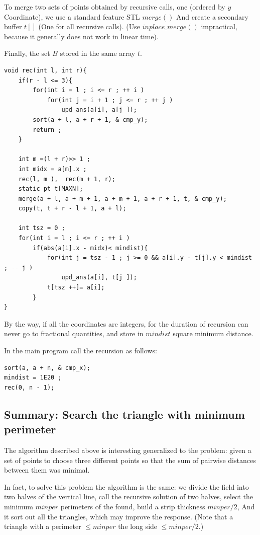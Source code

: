 To merge two sets of points obtained by recursive calls, one (ordered by $y$ Coordinate), we use a standard feature STL $merge()$ And create a secondary buffer $t []$ (One for all recursive calls). (Use $inplace \_merge()$ impractical, because it generally does not work in linear time).

Finally, the set $B$ stored in the same array $t$.

\begin{verbatim}
void rec(int l, int r){
    if(r - l <= 3){
        for(int i = l ; i <= r ; ++ i )
            for(int j = i + 1 ; j <= r ; ++ j )
                upd_ans(a[i], a[j ]);
        sort(a + l, a + r + 1, & cmp_y);
        return ;
    }
 
    int m =(l + r)>> 1 ;
    int midx = a[m].x ;
    rec(l, m ),  rec(m + 1, r);
    static pt t[MAXN];
    merge(a + l, a + m + 1, a + m + 1, a + r + 1, t, & cmp_y);
    copy(t, t + r - l + 1, a + l);
 
    int tsz = 0 ;
    for(int i = l ; i <= r ; ++ i )
        if(abs(a[i].x - midx)< mindist){
            for(int j = tsz - 1 ; j >= 0 && a[i].y - t[j].y < mindist ; -- j )
                upd_ans(a[i], t[j ]);
            t[tsz ++]= a[i];
        }
} 
\end{verbatim}
By the way, if all the coordinates are integers, for the duration of recursion can never go to fractional quantities, and store in $mindist$ square minimum distance.

In the main program call the recursion as follows:

\begin{verbatim}
sort(a, a + n, & cmp_x);
mindist = 1E20 ;
rec(0, n - 1); 
\end{verbatim}
\subsection{ Summary: Search the triangle with minimum perimeter }

The algorithm described above is interesting generalized to the problem: given a set of points to choose three different points so that the sum of pairwise distances between them was minimal.

In fact, to solve this problem the algorithm is the same: we divide the field into two halves of the vertical line, call the recursive solution of two halves, select the minimum $minper$ perimeters of the found, build a strip thickness $minper / 2$, And it sort out all the triangles, which may improve the response. (Note that a triangle with a perimeter $\le minper$ the long side $\le minper / 2$.)

